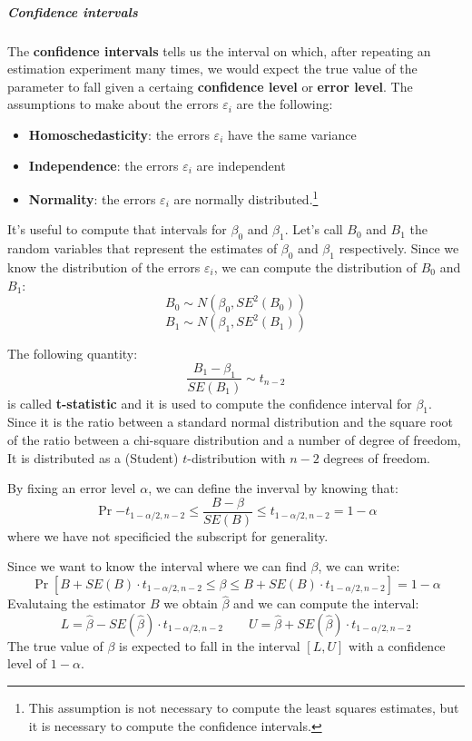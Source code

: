 \subparagraph*{Confidence intervals}
The \textbf{confidence intervals} tells us the interval on which, after repeating an estimation experiment many times, we would expect the true value of the parameter to fall given a certaing \textbf{confidence level} or \textbf{error level}.
The assumptions to make about the errors $\varepsilon_i$ are the following:
\begin{itemize}
    \item \textbf{Homoschedasticity}: the errors $\varepsilon_i$ have the same variance
    \item \textbf{Independence}: the errors $\varepsilon_i$ are independent
    \item \textbf{Normality}: the errors $\varepsilon_i$ are normally distributed.\footnote{This assumption is not necessary to compute the least squares estimates, but it is necessary to compute the confidence intervals.}
\end{itemize}
It's useful to compute that intervals for $\beta_0$ and $\beta_1$.
Let's call $B_0$ and $B_1$ the random variables that represent the estimates of $\beta_0$ and $\beta_1$ respectively. Since we know the distribution of the errors $\varepsilon_i$, we can compute the distribution of $B_0$ and $B_1$:
\[
    B_0 \sim N(\beta_0, SE^2(B_0))
\]
\[
    B_1 \sim N(\beta_1, SE^2(B_1))
\]

The following quantity:
\[
    \frac{B_1 - \beta_1}{SE(B_1)} \sim t_{n-2}
\]
is called \textbf{t-statistic} and it is used to compute the confidence interval for $\beta_1$. Since it is the ratio between a standard normal distribution and the square root of the ratio between a chi-square distribution and a number of degree of freedom, It is distributed as a (Student) $t$-distribution with $n-2$ degrees of freedom. %

By fixing an error level $\alpha$, we can define the inverval by knowing that:
\[
    \Pr{-t_{1-\alpha/2, n-2} \leq \frac{B- \beta}{SE(B)} \leq t_{1-\alpha/2, n-2}} = 1 - \alpha
\]
where we have not specificied the subscript for generality.

Since we want to know the interval where we can find $\beta$, we can write:
\[
    \Pr[B+SE(B)\cdot t_{1-\alpha/2, n-2} \leq \beta \leq B+SE(B)\cdot t_{1-\alpha/2, n-2}] = 1 - \alpha
\]
Evalutaing the estimator $B$ we obtain $\hat \beta$ and we can compute the interval:
\[
    L = \hat \beta - SE(\hat \beta) \cdot t_{1-\alpha/2, n-2}
    \qquad
    U = \hat \beta + SE(\hat \beta) \cdot t_{1-\alpha/2, n-2}
\]
The true value of $\beta$ is expected to fall in the interval $[L, U]$ with a confidence level of $1-\alpha$.

